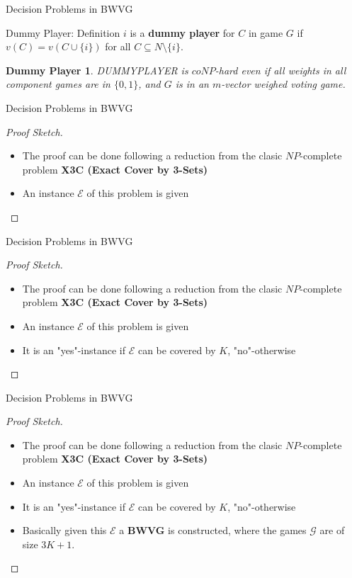 \documentclass{beamer}
\begin{document}
\begin{frame}[fragile]{Decision Problems in BWVG}
  \newtheorem{theorem2}{Dummy Player}
  \begin{block}{Dummy Player: Definition}
    $i$ is a \textbf{dummy player} for $C$ in game $G$ if $v(C) = v(C \cup \{i\})$ for all $C \subseteq N \setminus \{i\}$.
  \end{block}
  \begin{theorem2}
    DUMMYPLAYER is $coNP$-hard even if all weights in all component games are in $\{0,1\}$, and $G$ is in an $m$-vector weighed voting game.
  \end{theorem2}
\end{frame}

\begin{frame}[fragile]{Decision Problems in BWVG}
  \begin{proof}[Proof Sketch]
    \begin{itemize}
      \item The proof can be done following a reduction from the clasic $NP$-complete problem \textbf{X3C (Exact Cover by 3-Sets)}
      \item An instance $\mathcal{E}$ of this problem is given
    \end{itemize}
  \end{proof}
\end{frame}

\begin{frame}[fragile]{Decision Problems in BWVG}
  \begin{proof}[Proof Sketch]
    \begin{itemize}
      \item The proof can be done following a reduction from the clasic $NP$-complete problem \textbf{X3C (Exact Cover by 3-Sets)}
      \item An instance $\mathcal{E}$ of this problem is given
      \item It is an "yes"-instance if $\mathcal{E}$ can be covered by $K$, "no"-otherwise
    \end{itemize}
  \end{proof}
\end{frame}

\begin{frame}[fragile]{Decision Problems in BWVG}
  \begin{proof}[Proof Sketch]
    \begin{itemize}
      \item The proof can be done following a reduction from the clasic $NP$-complete problem \textbf{X3C (Exact Cover by 3-Sets)}
      \item An instance $\mathcal{E}$ of this problem is given
      \item It is an "yes"-instance if $\mathcal{E}$ can be covered by $K$, "no"-otherwise
      \item Basically given this $\mathcal{E}$ a \textbf{BWVG} is constructed, where the games $\mathcal{G}$ are of size $3K+1$.
    \end{itemize}
  \end{proof}
\end{frame}
\end{document}
